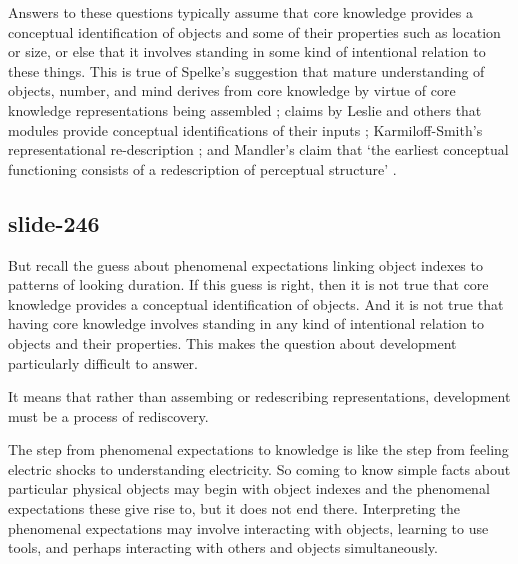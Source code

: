 \documentclass[12pt,\papersize]{extarticle}
\begin{document}
Answers to these questions typically assume that core knowledge
provides a conceptual identification of objects and some of their
properties such as location or size,
or else that it involves standing in some kind of intentional
relation to these things.
This is true of
Spelke’s suggestion that mature understanding of objects, number,
and mind derives from core knowledge by virtue of core knowledge
representations being assembled \citep{Spelke:2000nf};
claims by Leslie and others
that modules provide conceptual identifications of their inputs
\citep{Leslie:1988ct};
Karmiloff-Smith’s representational re-description
\citep{Karmiloff-Smith:1992lv};
and Mandler’s claim
that ‘the earliest conceptual functioning consists of a redescription
of perceptual structure’ \citep{Mandler:1992vn}.

\subsection{slide-246}
But recall the guess about phenomenal expectations linking object
indexes to patterns of looking duration.
If this guess is right, then it is not true that
core knowledge provides a conceptual identification of objects.
And it is not true that having core knowledge involves standing in any
kind of intentional relation to objects and their properties.
This makes the question about development particularly
difficult to answer.

It means that rather than assembing or redescribing representations,
development must be a process of rediscovery.

The step from phenomenal expectations to knowledge is like the step
from feeling electric shocks to understanding electricity.
So coming to know simple facts about particular physical
objects may begin with object indexes and the
phenomenal expectations these give rise to, but it does not end there.
Interpreting the phenomenal expectations may involve interacting with
objects, learning to use tools, and perhaps interacting with others
and objects simultaneously.
\end{document}
